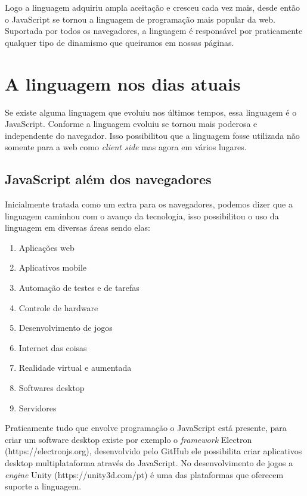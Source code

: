 \documentclass[
	12pt,				%
	openright,			%
	twoside,			%
	a4paper,			%
	english,			%
	brazil				%
	]{abntex2}
\begin{document}
Logo a linguagem adquiriu ampla aceitação e cresceu cada vez mais, desde então o JavaScript se tornou a linguagem de programação mais popular da web. Suportada por todos os navegadores, a linguagem é responsável por praticamente qualquer tipo de dinamismo que queiramos em nossas páginas.

\chapter{A linguagem nos dias atuais}

Se existe alguma linguagem que evoluiu nos últimos tempos, essa linguagem é o JavaScript. Conforme a linguagem evoluiu se tornou mais poderosa e independente do navegador. Isso possibilitou que a linguagem fosse utilizada não somente para a web como \textit{client side} mas agora em vários lugares. 

\section{JavaScript além dos navegadores}

Inicialmente tratada como um extra para os navegadores, podemos dizer que a linguagem caminhou com o avanço da tecnologia, isso possibilitou o uso da linguagem em diversas áreas sendo elas:

\begin{enumerate}[label=\alph*)]
\item Aplicações web
\item Aplicativos mobile 
\item Automação de testes e de tarefas
\item Controle de hardware
\item Desenvolvimento de jogos
\item Internet das coisas
\item Realidade virtual e aumentada
\item Softwares desktop
\item Servidores 
\end{enumerate}

Praticamente tudo que envolve programação o JavaScript está presente, para criar um software desktop existe por exemplo o \textit{framework} Electron (https://electronjs.org), desenvolvido pelo GitHub ele possibilita criar aplicativos desktop multiplataforma através do JavaScript. No desenvolvimento de jogos a \textit{engine} Unity (https://unity3d.com/pt) é uma das plataformas que oferecem suporte a linguagem.
\end{document}
